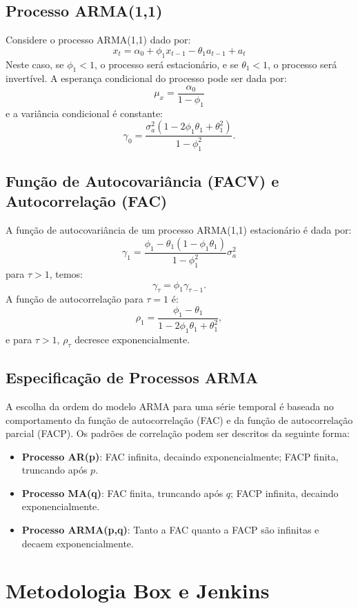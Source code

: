 \documentclass{sciposter}
\begin{document}
\begin{multicols}{3}
\subsection{Processo ARMA(1,1)}
Considere o processo ARMA(1,1) dado por:
\[
x_t = \alpha_0 + \phi_1 x_{t-1} - \theta_1 a_{t-1} + a_t
\]
Neste caso, se $\phi_1 < 1$, o processo será estacionário, e se $\theta_1 < 1$, o processo será invertível. A esperança condicional do processo pode ser dada por:
\[
\mu_x = \frac{\alpha_0}{1 - \phi_1}
\]
e a variância condicional é constante:
\[
\gamma_0 = \frac{\sigma_a^2 (1 - 2 \phi_1 \theta_1 + \theta_1^2)}{1 - \phi_1^2}.
\]

\subsection{Função de Autocovariância (FACV) e Autocorrelação (FAC)}
A função de autocovariância de um processo ARMA(1,1) estacionário é dada por:
\[
\gamma_1 = \frac{\phi_1 - \theta_1 (1 - \phi_1 \theta_1)}{1 - \phi_1^2} \sigma_a^2
\]
para $\tau > 1$, temos:
\[
\gamma_\tau = \phi_1 \gamma_{\tau-1}.
\]
A função de autocorrelação para $\tau = 1$ é:
\[
\rho_1 = \frac{\phi_1 - \theta_1}{1 - 2 \phi_1 \theta_1 + \theta_1^2},
\]
e para $\tau > 1$, $\rho_\tau$ decresce exponencialmente.

\subsection{Especificação de Processos ARMA}
A escolha da ordem do modelo ARMA para uma série temporal é baseada no comportamento da função de autocorrelação (FAC) e da função de autocorrelação parcial (FACP). Os padrões de correlação podem ser descritos da seguinte forma:
\begin{itemize}
    \item \textbf{Processo AR(p)}: FAC infinita, decaindo exponencialmente; FACP finita, truncando após $p$.
    \item \textbf{Processo MA(q)}: FAC finita, truncando após $q$; FACP infinita, decaindo exponencialmente.
    \item \textbf{Processo ARMA(p,q)}: Tanto a FAC quanto a FACP são infinitas e decaem exponencialmente.
\end{itemize}

\section{\textbf{Metodologia Box e Jenkins}}


\end{multicols}
\end{document}
